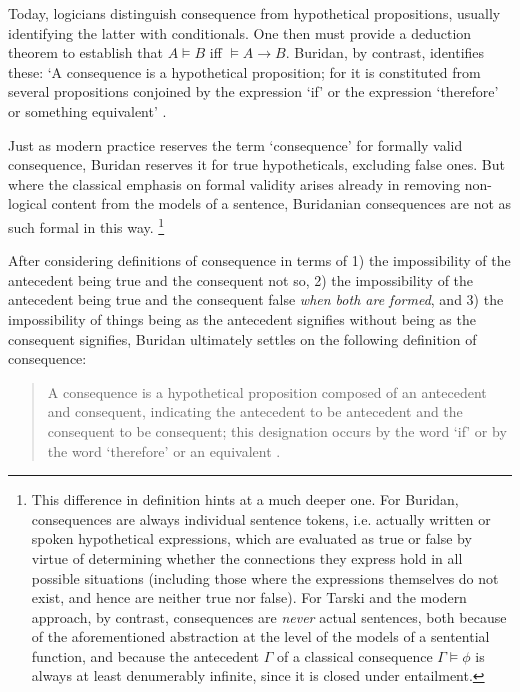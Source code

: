 \documentclass[]{article}
\begin{document}
Today, logicians distinguish consequence from hypothetical propositions, usually identifying the latter with conditionals. One then must provide a deduction theorem to establish that $A \models B$ iff $\models A \rightarrow B$. Buridan, by contrast, identifies these: `A consequence is a hypothetical proposition; for it is constituted from several propositions conjoined by the expression `if' or the expression `therefore' or something equivalent' \cite[TC I. 3, 6, alt.]{Buridan2015}. 

Just as modern practice reserves the term `consequence' for formally valid consequence, Buridan reserves it for true hypotheticals, excluding false ones\cite[TC I. 3, 66]{Buridan2015}. But where the classical emphasis on formal validity arises already in removing non-logical content from the models of a sentence, Buridanian consequences are not as such formal in this way. \footnote{This difference in definition hints at a much deeper one. For Buridan, consequences are always individual sentence tokens, i.e. actually written or spoken hypothetical expressions, which are evaluated as true or false by virtue of determining whether the connections they express hold in all possible situations (including those where the expressions themselves do not exist, and hence are neither true nor false). For Tarski and the modern approach, by contrast, consequences are \textit{never} actual sentences, both because of the aforementioned abstraction at the level of the models of a sentential function, and because the antecedent $\Gamma$ of a classical consequence $\Gamma \models \phi$ is always at least denumerably infinite, since it is closed under entailment.}

After considering definitions of consequence in terms of 1) the impossibility of the antecedent being true and the consequent not so, 2) the impossibility of the antecedent being true and the consequent false \textit{when both are formed}, and 3) the impossibility of things being as the antecedent signifies without being as the consequent signifies, Buridan ultimately settles on the following definition of consequence: 

\begin{quote}
A consequence is a hypothetical proposition composed of an antecedent and consequent, indicating the antecedent to be antecedent and the consequent to be consequent; this designation occurs by the word `if' or by the word `therefore' or an equivalent \cite[TC I. 3, 67]{Buridan2015}.
\end{quote}
\end{document}
